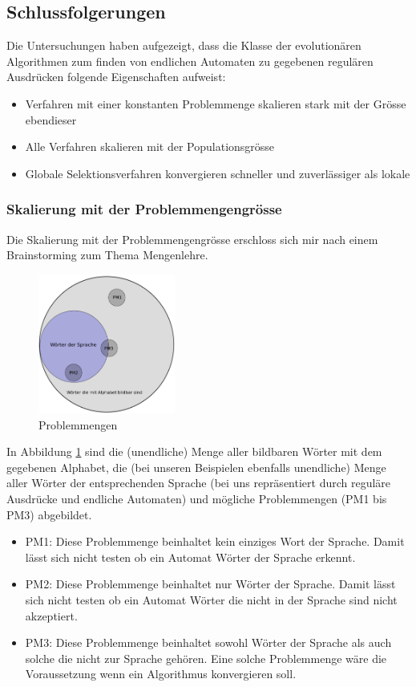 \subsection{Schlussfolgerungen}
\label{sec:schlussfolgerungen}
Die Untersuchungen haben aufgezeigt, dass die Klasse der evolutionären Algorithmen zum finden von endlichen Automaten zu gegebenen regulären Ausdrücken folgende Eigenschaften aufweist:
\begin{itemize}
	\item Verfahren mit einer konstanten Problemmenge skalieren stark mit der Grösse ebendieser
	\item Alle Verfahren skalieren mit der Populationsgrösse
	\item Globale Selektionsverfahren konvergieren schneller und zuverlässiger als lokale
\end{itemize}

\subsubsection{Skalierung mit der Problemmengengrösse}
Die Skalierung mit der Problemmengengrösse erschloss sich mir nach einem Brainstorming zum Thema Mengenlehre.

\begin{figure}[ht]
  \centering
  \includegraphics[width=0.4\textwidth]{images/problemmengen.pdf}
  \caption[Problemmengen]{Problemmengen}
  \label{fig:problemmengen}
\end{figure}

In Abbildung \ref{fig:problemmengen} sind die (unendliche) Menge aller bildbaren Wörter mit dem gegebenen Alphabet, die (bei unseren Beispielen ebenfalls unendliche) Menge aller Wörter der entsprechenden Sprache (bei uns repräsentiert durch reguläre Ausdrücke und endliche Automaten) und mögliche Problemmengen (PM1 bis PM3) abgebildet.
\begin{itemize}
	\item PM1: Diese Problemmenge beinhaltet kein einziges Wort der Sprache. Damit lässt sich nicht testen ob ein Automat Wörter der Sprache erkennt.
	\item PM2: Diese Problemmenge beinhaltet nur Wörter der Sprache. Damit lässt sich nicht testen ob ein Automat Wörter die nicht in der Sprache sind nicht akzeptiert.
	\item PM3: Diese Problemmenge beinhaltet sowohl Wörter der Sprache als auch solche die nicht zur Sprache gehören. Eine solche Problemmenge wäre die Voraussetzung wenn ein Algorithmus konvergieren soll.
\end{itemize}

